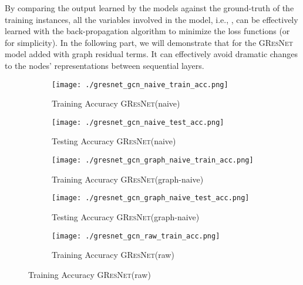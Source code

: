 \documentclass{article}
\newcommand{\gresnet}{\textsc{GResNet}}
\begin{document}
By comparing the output  learned by the models against the ground-truth  of the training instances, all the variables involved in the model, i.e., , can be effectively learned with the back-propagation algorithm to minimize the loss functions   (or  for simplicity). In the following part, we will demonstrate that for the {\gresnet} model added with graph residual terms. It can effectively avoid dramatic changes to the nodes' representations between sequential layers.

\begin{figure}
\vspace{-30pt}
    \centering
\begin{subfigure}[b]{.24\textwidth}
    	\texttt{[image: ./gresnet\_gcn\_naive\_train\_acc.png]}
	\vspace{-10pt}
	\captionsetup{justification=centering}
    	\caption{\small Training Accuracy {\gresnet}(naive)}\label{fig:gresnet_naive_acc_train}
    \end{subfigure}\hfill
    \begin{subfigure}[b]{.24\textwidth}
    	\texttt{[image: ./gresnet\_gcn\_naive\_test\_acc.png]}
	\vspace{-10pt}
	\captionsetup{justification=centering}
    	\caption{Testing Accuracy {\gresnet}(naive)}\label{fig:gresnet_naive_acc_test}
    \end{subfigure}\hfill
    \begin{subfigure}[b]{.24\textwidth}
    	\texttt{[image: ./gresnet\_gcn\_graph\_naive\_train\_acc.png]}
	\vspace{-10pt}
	\captionsetup{justification=centering}
    	\caption{Training Accuracy {\gresnet}(graph-naive)}\label{fig:gresnet_graph_naive_acc_train}
    \end{subfigure}\hfill
    \begin{subfigure}[b]{.24\textwidth}
    	\texttt{[image: ./gresnet\_gcn\_graph\_naive\_test\_acc.png]}
	\vspace{-10pt}
	\captionsetup{justification=centering}
    	\caption{Testing Accuracy {\gresnet}(graph-naive)}\label{fig:gresnet_graph_naive_acc_test}
    \end{subfigure}\hfill
    \begin{subfigure}[b]{.24\textwidth}
    	\texttt{[image: ./gresnet\_gcn\_raw\_train\_acc.png]}
	\vspace{-10pt}
	\captionsetup{justification=centering}
    	\caption{Training Accuracy {\gresnet}(raw)}\label{fig:gresnet_raw_acc_train}

\end{subfigure}
\end{figure}
\end{document}
